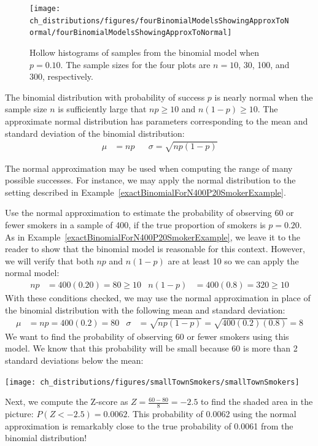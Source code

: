 \begin{figure}[h]
\centering
\texttt{[image: ch\_distributions/figures/fourBinomialModelsShowingApproxToNormal/fourBinomialModelsShowingApproxToNormal]}
\caption{Hollow histograms of samples from the binomial model when $p=0.10$. The sample sizes for the four plots are $n=10$, 30, 100, and 300, respectively.}
\label{fourBinomialModelsShowingApproxToNormal}
\end{figure}

\begin{termBox}{
The binomial distribution with probability of success $p$ is nearly normal when the sample size $n$ is sufficiently large that $np\ge 10$ and $n(1-p)\ge 10$. The approximate normal distribution has parameters corresponding to the mean and standard deviation of the binomial distribution:\vspace{-1.5mm}
\begin{align*}
\mu &= np
&&\sigma= \sqrt{np(1-p)}
\end{align*}}
\end{termBox}

The normal approximation may be used when computing the range of many possible successes. For instance, we may apply the normal distribution to the setting described in Example~\ref{exactBinomialForN400P20SmokerExample}.

\textA{\newpage}

\begin{example}{Use the normal approximation to estimate the probability of observing 60 or fewer smokers in a sample of 400, if the true proportion of smokers is $p=0.20$.}\label{approxBinomialForN400P20SmokerExample}
As in Example~\ref{exactBinomialForN400P20SmokerExample},  we leave it to the reader to show that the binomial model is reasonable for this context. However, we will verify that both $np$ and $n(1-p)$ are at least 10 so we can apply the normal model:
\begin{align*}
np&=400(0.20)=80\ge 10
&
n(1-p)&=400(0.8)=320\ge 10
\end{align*}
With these conditions checked, we may use the normal approximation in place of the binomial distribution with the following mean and standard deviation:
\begin{align*}
\mu &= np = 400(0.2)=80
&
\sigma &= \sqrt{np(1-p)} = \sqrt{400(0.2)(0.8)}= 8
\end{align*}
We want to find the probability of observing 60 or fewer smokers using this model. We know that this probability will be small because 60 is more than 2 standard deviations below the mean:
\begin{center}
\texttt{[image: ch\_distributions/figures/smallTownSmokers/smallTownSmokers]}
\end{center}
Next, we compute the Z-score as $Z=\frac{60 - 80}{8} = -2.5$ to find the shaded area in the picture: $P(Z < -2.5) = 0.0062$. This probability of 0.0062 using the normal approximation is remarkably close to the true probability of 0.0061 from the binomial distribution!
\end{example}

